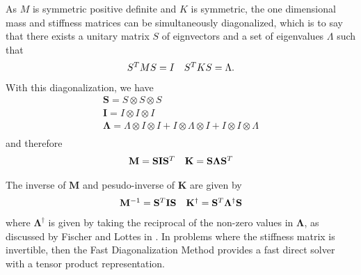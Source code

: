 As $M$ is symmetric positive definite and $K$ is symmetric, the one dimensional mass and stiffness matrices can be simultaneously diagonalized, which is to say that there exists a unitary matrix $S$ of eignvectors and a set of eigenvalues $\Lambda$ such that
\begin{equation}
\begin{array}{c c}
S^T M S = I  &  S^T K S = \Lambda.
\end{array}
\end{equation}
With this diagonalization, we have
\begin{equation}
\begin{array}{c}
\mathbf{S}       = S \otimes S \otimes S                                                                     \\
\mathbf{I}       = I \otimes I \otimes I                                                                     \\
\mathbf{\Lambda} = \Lambda \otimes I \otimes  I + I \otimes \Lambda \otimes I + I \otimes I \otimes \Lambda  \\
\end{array}
\end{equation}
and therefore
\begin{equation}
\begin{array}{c c}
\mathbf{M}   = \mathbf{S} \mathbf{I} \mathbf{S}^T  &  \mathbf{K} = \mathbf{S} \mathbf{\Lambda} \mathbf{S}^T  \\
\end{array}
\end{equation}

The inverse of $\mathbf{M}$ and pesudo-inverse of $\mathbf{K}$ are given by
\begin{equation}
\begin{array}{c c}
\mathbf{M}^{-1} = \mathbf{S}^T \mathbf{I} \mathbf{S}  &  \mathbf{K}^{\dagger} = \mathbf{S}^T \mathbf{\Lambda}^{\dagger} \mathbf{S}
\end{array}
\label{eq:fdminverse}
\end{equation}
where $\mathbf{\Lambda}^{\dagger}$ is given by taking the reciprocal of the non-zero values in $\mathbf{\Lambda}$, as discussed by Fischer and Lottes in \cite{fischer2005hybrid}.
In problems where the stiffness matrix is invertible, then the Fast Diagonalization Method provides a fast direct solver with a tensor product representation.

